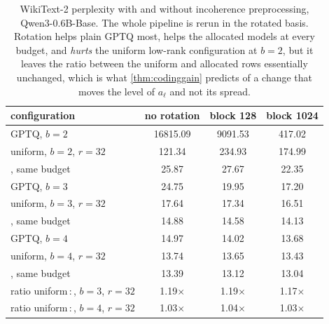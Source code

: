 \begin{table}[H]
\centering
\small
\setlength{\tabcolsep}{4pt}
\caption{WikiText-2 perplexity with and without incoherence preprocessing, Qwen3-0.6B-Base. The whole pipeline is rerun in the rotated basis. Rotation helps plain GPTQ most, helps the allocated models at every budget, and \emph{hurts} the uniform low-rank configuration at $b=2$, but it leaves the ratio between the uniform and allocated rows essentially unchanged, which is what \cref{thm:codinggain} predicts of a change that moves the level of $a_\ell$ and not its spread.}
\label{tab:rotationppl}
\begin{tabular}{lccc}
\toprule
configuration & no rotation & block 128 & block 1024 \\
\midrule
GPTQ, $b=2$ & 16815.09 & 9091.53 & 417.02 \\
\quad uniform, $b=2$, $r=32$ & 121.34 & 234.93 & 174.99 \\
\quad \method{}, same budget & 25.87 & 27.67 & 22.35 \\
GPTQ, $b=3$ & 24.75 & 19.95 & 17.20 \\
\quad uniform, $b=3$, $r=32$ & 17.64 & 17.34 & 16.51 \\
\quad \method{}, same budget & 14.88 & 14.58 & 14.13 \\
GPTQ, $b=4$ & 14.97 & 14.02 & 13.68 \\
\quad uniform, $b=4$, $r=32$ & 13.74 & 13.65 & 13.43 \\
\quad \method{}, same budget & 13.39 & 13.12 & 13.04 \\
\midrule
ratio uniform\,:\,\method{}, $b=3$, $r=32$ & 1.19$\times$ & 1.19$\times$ & 1.17$\times$ \\
ratio uniform\,:\,\method{}, $b=4$, $r=32$ & 1.03$\times$ & 1.04$\times$ & 1.03$\times$ \\
\bottomrule
\end{tabular}
\end{table}
